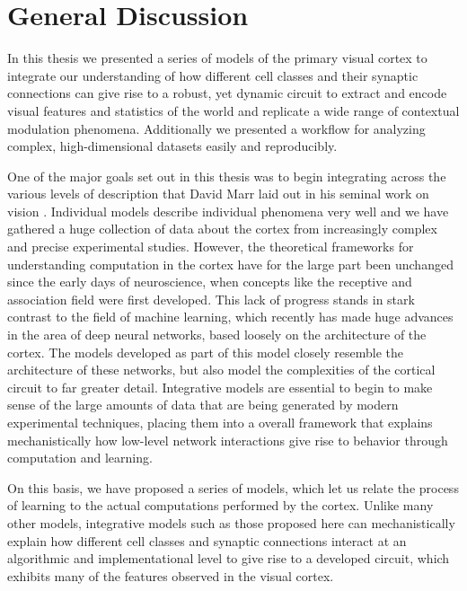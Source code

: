 \chapter{General Discussion}

In this thesis we presented a series of models of the primary visual
cortex to integrate our understanding of how different cell classes
and their synaptic connections can give rise to a robust, yet dynamic
circuit to extract and encode visual features and statistics of the
world and replicate a wide range of contextual modulation
phenomena. Additionally we presented a workflow for analyzing complex,
high-dimensional datasets easily and reproducibly.

One of the major goals set out in this thesis was to begin integrating
across the various levels of description that David Marr laid out in
his seminal work on vision \citep{Marr1982}. Individual models
describe individual phenomena very well and we have gathered a huge
collection of data about the cortex from increasingly complex and
precise experimental studies.  However, the theoretical frameworks for
understanding computation in the cortex have for the large part been
unchanged since the early days of neuroscience, when concepts like the
receptive and association field were first developed. This lack of
progress stands in stark contrast to the field of machine learning,
which recently has made huge advances in the area of deep neural
networks, based loosely on the architecture of the cortex. The models
developed as part of this model closely resemble the architecture of
these networks, but also model the complexities of the cortical
circuit to far greater detail. Integrative models are essential to
begin to make sense of the large amounts of data that are being
generated by modern experimental techniques, placing them into a
overall framework that explains mechanistically how low-level network
interactions give rise to behavior through computation and learning.

On this basis, we have proposed a series of models, which let us relate
the process of learning to the actual computations performed by the
cortex. Unlike many other models, integrative models such as those
proposed here can mechanistically explain how different cell classes
and synaptic connections interact at an algorithmic and
implementational level to give rise to a developed circuit, which
exhibits many of the features observed in the visual cortex.

